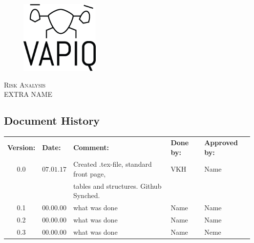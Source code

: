 \documentclass{article}
\author{Tomas Lyngroth \\ Aleksander Holthe \\ Vanja Katinka Halvorsen \\ Stian Fredriksen \\ Kent Kjeldaas \\ Katrine Sundal Haune}
\makeatletter
\let\vapiqteam\@author
\makeatother
\begin{document}
\begin{titlepage}
    \centering
    \pagecolor{gainsboro}
	\\[3.0 cm]
    \begin{figure}[h]
        \centering
        \includegraphics[width = 0.35\textwidth]{VAPIQ-PICTURES//Logo2_Tilted.png}
        \\[2.0 cm] 
    \end{figure}                              
    \textsc{\Huge Risk Analysis}  
    \\[1 cm]
    \textsc{\Large EXTRA NAME}   
    \\[3.0 cm]
	\large \vapiqteam      
\end{titlepage}
\pagecolor{white}


\begin{center}
\section*{\textbf{Document History}}
\begin{tabular}{cllll}
\rowcolor{cadetgrey}
\textbf{Version:}    &\textbf{Date:} 	 &\textbf{Comment:}    &\textbf{Done by:}   &\textbf{Approved by:}  \\

0.0       & $07.01.17$   & Created .tex-file, standard front page, & VKH  & Name \\
          &              & tables and structures. Github Synched.    &     & \\\rowcolor{gainsboro}
0.1       & $00.00.00$   & what was done  & Name    & Name          \\
0.2       & $00.00.00$   & what was done  & Name    & Name          \\ \rowcolor{gainsboro}
0.3       & $00.00.00$   & what was done  & Name    & Neme          \\
\end{tabular}                                                                   
\end{center}
\end{document}
